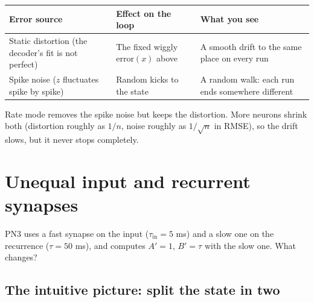 \documentclass[11pt,letterpaper]{article}
\newcommand{\tin}{\tau_{\mathrm{in}}}
\begin{document}
\begin{center}
\end{center}

\begin{center}
\begin{tabular}{@{}p{}p{}p{}@{}}
\toprule
Error source & Effect on the loop & What you see \\
\midrule
Static distortion (the decoder's fit is not perfect) & The fixed wiggly $\mathrm{error}(x)$ above & A smooth drift to the same place on every run \\
Spike noise ($z$ fluctuates spike by spike) & Random kicks to the state & A random walk: each run ends somewhere different \\
\bottomrule
\end{tabular}
\end{center}
Rate mode removes the spike noise but keeps the distortion. More neurons shrink both (distortion roughly as $1/n$, noise roughly as $1/\sqrt n$ in RMSE), so the drift slows, but it never stops completely.

\section{Unequal input and recurrent synapses}

PN3 uses a fast synapse on the input ($\tin = 5$ ms) and a slow one on the recurrence ($\tau = 50$ ms), and computes $A' = 1$, $B' = \tau$ with the slow one. What changes?

\subsection*{The intuitive picture: split the state in two}
\end{document}
